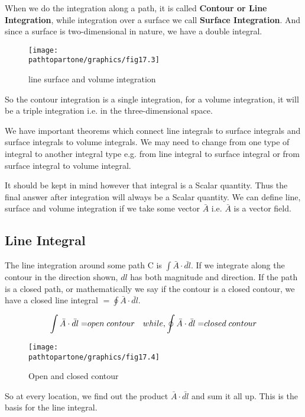 When we do the integration along a path, it is called \textbf{Contour or Line Integration}, while integration over a surface we call \textbf{Surface Integration}. And since a surface is two-dimensional in nature, we have a double integral.

\begin{figure}[h]
\centering
\texttt{[image: \\pathtopartone/graphics/fig17.3]}
\caption{line surface and volume integration}
\end{figure}

So the contour integration is a single integration, for a volume integration, it will be a triple integration i.e. in the three-dimensional space.

We have important theorems which connect line integrals to surface integrals and surface integrals to volume integrals. We may need to change from one type of integral to another integral type e.g. from line integral to surface integral or from surface integral to volume integral.

It should be kept in mind however that integral is a Scalar quantity. Thus the final answer after integration will always be a Scalar quantity. We can define line, surface and volume integration if we take some vector $\bar{A}$ i.e. $\bar{A}$ is a vector field. 

\subsection{Line Integral}

The line integration around some path C is ${\displaystyle \int  \bar{A} \cdot \bar{dl}}$. If we integrate along the contour in the direction shown, $dl$ has both magnitude and direction. If the path is a closed path, or mathematically we say if the contour is a closed contour, we have a closed line integral $= {\displaystyle \oint  \bar{A} \cdot \bar{dl}}$.

\begin{equation}
{\displaystyle \int  \bar{A} \cdot \bar{dl} = }open\; contour\quad while, \newline  {\displaystyle \oint  \bar{A} \cdot \bar{dl}= }closed\; contour
\end{equation}
\begin{figure}
\centering
\texttt{[image: \\pathtopartone/graphics/fig17.4]}
\caption{Open and closed contour}
\end{figure}

So at every location, we find out the product $\bar{A} \cdot \bar{dl}$ and sum it all up. This is the basis for the line integral.
